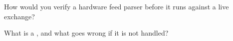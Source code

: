 \begin{interviewq}\label{iq:nw:programmable-hardware-i-architecture-and-toolchain:5}
How would you verify a hardware feed parser before it runs against a live exchange?
\end{interviewq}

\begin{interviewq}\label{iq:nw:programmable-hardware-i-architecture-and-toolchain:6}
What is a , and what goes wrong if it is not handled?
\end{interviewq}
